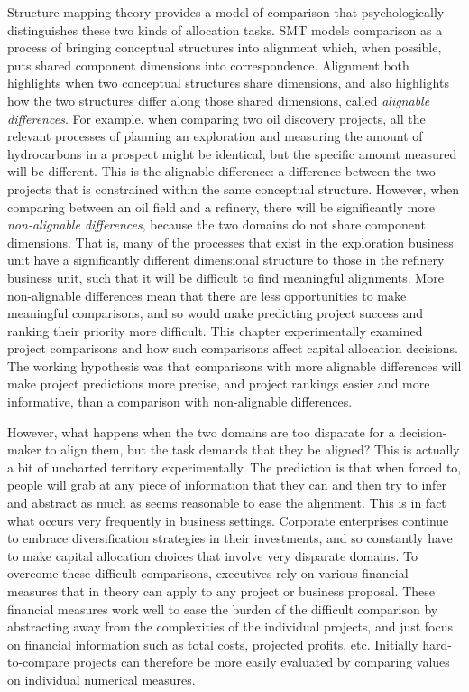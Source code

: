 \documentclass[a4paper, nobind, dvipsnames]{templates/ociamthesis}
\theoremstyle{definition}
\theoremstyle{definition}
\theoremstyle{definition}
\theoremstyle{definition}
\theoremstyle{remark}
\begin{document}
Structure-mapping theory \autocites[SMT;][]{gentner1997,gentner1983} provides a model of
comparison that psychologically distinguishes these two kinds of allocation
tasks. SMT models comparison as a process of bringing conceptual structures into
alignment which, when possible, puts shared component dimensions into
correspondence. Alignment both highlights when two conceptual structures share
dimensions, and also highlights how the two structures differ along those shared
dimensions, called \emph{alignable differences}. For example, when comparing two oil
discovery projects, all the relevant processes of planning an exploration and
measuring the amount of hydrocarbons in a prospect might be identical, but the
specific amount measured will be different. This is the alignable difference: a
difference between the two projects that is constrained within the same
conceptual structure. However, when comparing between an oil field and a
refinery, there will be significantly more \emph{non-alignable differences}, because
the two domains do not share component dimensions. That is, many of the
processes that exist in the exploration business unit have a significantly
different dimensional structure to those in the refinery business unit, such
that it will be difficult to find meaningful alignments. More non-alignable
differences mean that there are less opportunities to make meaningful
comparisons, and so would make predicting project success and ranking their
priority more difficult. This chapter experimentally examined project
comparisons and how such comparisons affect capital allocation decisions. The
working hypothesis was that comparisons with more alignable differences will
make project predictions more precise, and project rankings easier and more
informative, than a comparison with non-alignable differences.

However, what happens when the two domains are too disparate for a
decision-maker to align them, but the task demands that they be aligned? This is
actually a bit of uncharted territory experimentally. The prediction is that
when forced to, people will grab at any piece of information that they can and
then try to infer and abstract as much as seems reasonable to ease the
alignment. This is in fact what occurs very frequently in business settings.
Corporate enterprises continue to embrace diversification strategies in their
investments, and so constantly have to make capital allocation choices that
involve very disparate domains. To overcome these difficult comparisons,
executives rely on various financial measures that in theory can apply to any
project or business proposal. These financial measures work well to ease the
burden of the difficult comparison by abstracting away from the complexities of
the individual projects, and just focus on financial information such as total
costs, projected profits, etc. Initially hard-to-compare projects can therefore
be more easily evaluated by comparing values on individual numerical measures.
\end{document}

